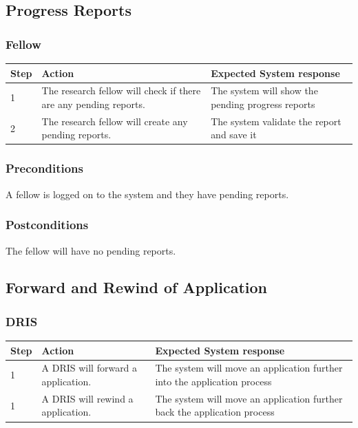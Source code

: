 \documentclass[12pt]{article}
\begin{document}
\subsection{Progress Reports}
\subsubsection{Fellow}

\begin{center}
\begin{tabular}{|l|p{6cm}|p{8cm}|}
\hline
Step & Action & Expected System response \\
\hline
1 & The research fellow will check if there are any pending reports. & The system will show the pending progress reports \\
\hline

2 & The research fellow will create any pending reports. & The system validate the report and save it\\
\hline
\end{tabular}
\end{center}

\subsubsection*{Preconditions}
A fellow is logged on to the system and they have pending reports.

\subsubsection*{Postconditions}
The fellow will have no pending reports.

\subsection{Forward and Rewind of Application}
\subsubsection{DRIS}

\begin{center}
\begin{tabular}{|l|p{6cm}|p{8cm}|}
\hline
Step & Action & Expected System response \\
\hline
1 & A DRIS will forward a application. & The system will move an application further into the application process \\
\hline

1 & A DRIS will rewind a application. & The system will move an application further back the application process \\
\hline
\end{tabular}
\end{center}
\end{document}
